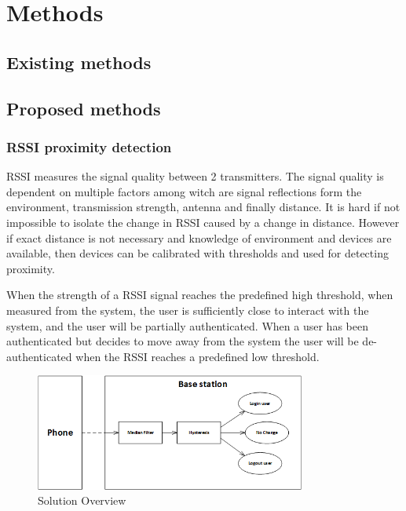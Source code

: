 \section{Methods}

\subsection{Existing methods}

\subsection{Proposed methods}

\subsubsection{RSSI proximity detection}


RSSI measures the signal quality between 2 transmitters.
The signal quality is dependent on multiple factors among witch are signal reflections form the environment, transmission strength, antenna and finally distance.
It is hard if not impossible to isolate the change in RSSI caused by a change in distance.
However if exact distance is not necessary and knowledge of environment and devices are available, then devices can be calibrated with thresholds and used for detecting proximity.


When the strength of a RSSI signal reaches the predefined high threshold, when measured from the system, the user is sufficiently close to interact with the system, and the user will be partially authenticated.
When a user has been authenticated but decides to move away from the system the user will be de-authenticated when the RSSI reaches a predefined low threshold.

\begin{figure}[!t]
	\centering
	\includegraphics[width=3.5in]{img/SolutionOverview}
	\caption{ Solution Overview }
	\label{fig_solution_overview}
\end{figure}

